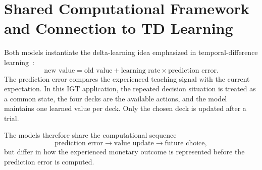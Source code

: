 \section{Shared Computational Framework and Connection to TD Learning}

Both models instantiate the delta-learning idea emphasized in temporal-difference learning~\cite{suttonbarto2018}:
\begin{equation}
    \text{new value}=\text{old value}+\text{learning rate}\times\text{prediction error}.
\end{equation}
The prediction error compares the experienced teaching signal with the current expectation. In this IGT application, the repeated decision situation is treated as a common state, the four decks are the available actions, and the model maintains one learned value per deck. Only the chosen deck is updated after a trial.

The models therefore share the computational sequence
\begin{equation}
    \text{prediction error}\rightarrow\text{value update}\rightarrow\text{future choice},
\end{equation}
but differ in how the experienced monetary outcome is represented before the prediction error is computed.
